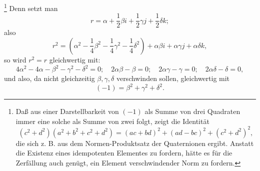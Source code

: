 \footnote{Daß aus einer Darstellbarkeit von $(-1)$ als Summe von drei Quadraten immer eine solche als Summe von zwei folgt, zeigt die Identität
\[
(c^2+d^2)(a^2+b^2+c^2+d^2)=(ac+bd)^2+(ad-bc)^2+(c^2+d^2)^2,
\]
die sich z. B. aus dem Normen-Produktsatz der Quaternionen ergibt. Anstatt die Existenz eines idempotenten Elementes zu fordern, hätte es für die Zerfällung auch genügt, ein Element verschwindender Norm zu fordern.} Denn setzt man
\[
        r=\alpha+\frac12\beta i+\frac12\gamma j+\frac12\delta k;
\]
also
\[
        r^2=\left(\alpha^2-\frac14\beta^2-\frac14\gamma^2-\frac14\delta^2\right)
          +\alpha\beta i+\alpha\gamma j+\alpha\delta k,
\]
so wird $r^2=r$ gleichwertig mit:
\[
4\alpha^2-4\alpha-\beta^2-\gamma^2-\delta^2=0;\quad
2\alpha\beta-\beta=0;\quad 2\alpha\gamma-\gamma=0;\quad 2\alpha\delta-\delta=0,
\]
und also, da nicht gleichzeitig $\beta,\gamma,\delta$ verschwinden sollen, gleichwertig mit
\[
        (-1)=\beta^2+\gamma^2+\delta^2.
\]

